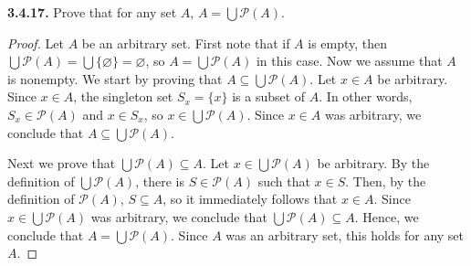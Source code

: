 \documentclass[12pt]{amsart}
\newenvironment{statement}[1]{\smallskip\noindent\color[rgb]{.6627, .3529, .6314} {\bf #1.}}{}
\theoremstyle{definition}
\theoremstyle{remark}
\newcommand{\powerset}[1]{\mathscr{P} \left( #1 \right)}
\begin{document}
\begin{statement}{3.4.17}
Prove that for any set $A$, $A = \bigcup \powerset{A}$.
\end{statement}

\begin{proof}
Let $A$ be an arbitrary set.
First note that if $A$ is empty, then $\bigcup \powerset{A} = \bigcup \{ \varnothing \} = \varnothing$, so $A = \bigcup \powerset{A}$ in this case.
Now we assume that $A$ is nonempty.
We start by proving that $A \subseteq \bigcup \powerset{A}$.
Let $x \in A$ be arbitrary.
Since $x \in A$, the singleton set $S_x = \{ x \}$ is a subset of $A$.
In other words, $S_x \in \powerset{A}$ and $x \in S_x$, so $x \in \bigcup \powerset{A}$.
Since $x \in A$ was arbitrary, we conclude that $A \subseteq \bigcup \powerset{A}$.

Next we prove that $\bigcup \powerset{A} \subseteq A$.
Let $x \in \bigcup \powerset{A}$ be arbitrary.
By the definition of $\bigcup \powerset{A}$, there is $S \in \powerset{A}$ such that $x \in S$.
Then, by the definition of $\powerset{A}$, $S \subseteq A$, so it immediately follows that $x \in A$.
Since $x \in \bigcup \powerset{A}$ was arbitrary, we conclude that $\bigcup \powerset{A} \subseteq A$.
Hence, we conclude that $A = \bigcup \powerset{A}$.
Since $A$ was an arbitrary set, this holds for any set $A$.
\end{proof}
\end{document}
